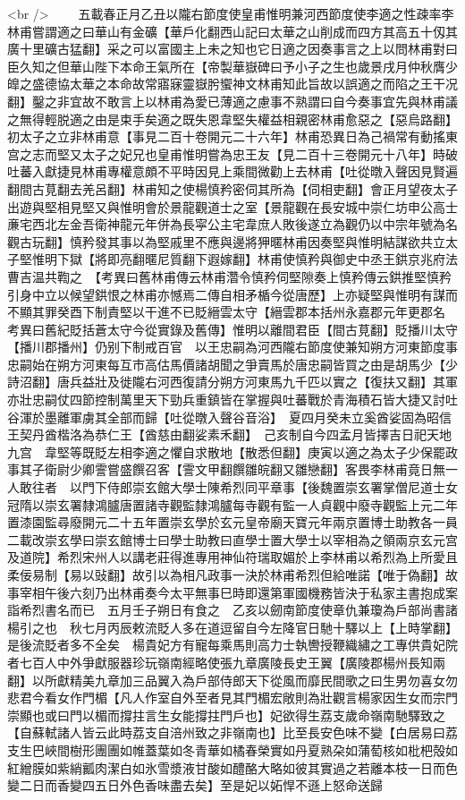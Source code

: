 <br />
　　五載春正月乙丑以隴右節度使皇甫惟明兼河西節度使李適之性疎率李林甫嘗謂適之曰華山有金礦【華戶化翻西山記曰太華之山削成而四方其高五十仭其廣十里礦古猛翻】采之可以富國主上未之知也它日適之因奏事言之上以問林甫對曰臣久知之但華山陛下本命王氣所在【帝製華嶽碑曰予小子之生也歲景戌月仲秋膺少皥之盛德協太華之本命故常寤寐靈嶽肹蠁神文林甫知此旨故以誤適之而陷之王干况翻】鑿之非宜故不敢言上以林甫為愛已薄適之慮事不熟謂曰自今奏事宜先與林甫議之無得輕脱適之由是束手矣適之既失恩韋堅失權益相親密林甫愈惡之【惡烏路翻】初太子之立非林甫意【事見二百十卷開元二十六年】林甫恐異日為己禍常有動搖東宫之志而堅又太子之妃兄也皇甫惟明嘗為忠王友【見二百十三卷開元十八年】時破吐蕃入獻捷見林甫專權意頗不平時因見上乘間微勸上去林甫【吐從暾入聲因見賢遍翻間古莧翻去羌呂翻】林甫知之使楊慎矜密伺其所為【伺相吏翻】會正月望夜太子出遊與堅相見堅又與惟明會於景龍觀道士之室【景龍觀在長安城中崇仁坊申公高士亷宅西北左金吾衛神龍元年併為長寜公主宅韋庶人敗後遂立為觀仍以中宗年號為名觀古玩翻】慎矜發其事以為堅戚里不應與邊將狎暱林甫因奏堅與惟明結謀欲共立太子堅惟明下獄【將即亮翻暱尼質翻下遐嫁翻】林甫使慎矜與御史中丞王鉷京兆府法曹吉温共鞫之　【考異曰舊林甫傳云林甫濳令慎矜伺堅隙奏上慎矜傳云鉷推堅慎矜引身中立以候望鉷恨之林甫亦憾焉二傳自相矛楯今從唐歷】上亦疑堅與惟明有謀而不顯其罪癸酉下制責堅以干進不已貶縉雲太守【縉雲郡本括州永嘉郡元年更郡名　考異曰舊紀貶括蒼太守今從實錄及舊傳】惟明以離間君臣【間古莧翻】貶播川太守【播川郡播州】仍别下制戒百官　以王忠嗣為河西隴右節度使兼知朔方河東節度事忠嗣始在朔方河東每互市高估馬價諸胡聞之爭賣馬於唐忠嗣皆買之由是胡馬少【少詩沼翻】唐兵益壯及徙隴右河西復請分朔方河東馬九千匹以實之【復扶又翻】其軍亦壯忠嗣仗四節控制萬里天下勁兵重鎮皆在掌握與吐蕃戰於青海積石皆大捷又討吐谷渾於墨離軍虜其全部而歸【吐從暾入聲谷音浴】　夏四月癸未立奚酋娑固為昭信王契丹酋楷洛為恭仁王【酋慈由翻娑素禾翻】　己亥制自今四孟月皆擇吉日祀天地九宫　韋堅等既貶左相李適之懼自求散地【散悉但翻】庚寅以適之為太子少保罷政事其子衛尉少卿霅嘗盛饌召客【霅文甲翻饌雛皖翻又雛戀翻】客畏李林甫竟日無一人敢往者　以門下侍郎崇玄館大學士陳希烈同平章事【後魏置崇玄署掌僧尼道士女冠隋以崇玄署隸鴻臚唐置諸寺觀監隸鴻臚每寺觀有監一人貞觀中廢寺觀監上元二年置漆園監尋廢開元二十五年置崇玄學於玄元皇帝廟天寶元年兩京置博士助教各一員二載改崇玄學曰崇玄館博士曰學士助教曰直學士置大學士以宰相為之領兩京玄元宫及道院】希烈宋州人以講老莊得進專用神仙符瑞取媚於上李林甫以希烈為上所愛且柔佞易制【易以䜴翻】故引以為相凡政事一決於林甫希烈但給唯諾【唯于偽翻】故事宰相午後六刻乃出林甫奏今太平無事巳時即還第軍國機務皆決于私家主書抱成案詣希烈書名而已　五月壬子朔日有食之　乙亥以劒南節度使章仇兼瓊為戶部尚書諸楊引之也　秋七月丙辰敕流貶人多在道逗留自今左降官日馳十驛以上【上時掌翻】是後流貶者多不全矣　楊貴妃方有寵每乘馬則高力士執轡授鞭織繡之工專供貴妃院者七百人中外爭獻服器珍玩嶺南經略使張九章廣陵長史王翼【廣陵郡楊州長知兩翻】以所獻精美九章加三品翼入為戶部侍郎天下從風而靡民間歌之曰生男勿喜女勿悲君今看女作門楣【凡人作室自外至者見其門楣宏敞則為壯觀言楊家因生女而宗門崇顯也或曰門以楣而撐拄言生女能撐拄門戶也】妃欲得生荔支歲命嶺南馳驛致之【自蘇軾諸人皆云此時荔支自涪州致之非嶺南也】比至長安色味不變【白居易曰荔支生巴峽間樹形團團如帷蓋葉如冬青華如橘春榮實如丹夏熟朶如蒲萄核如枇杷殻如紅繒膜如紫綃瓤肉潔白如氷雪漿液甘酸如醴酪大略如彼其實過之若離本枝一日而色變二日而香變四五日外色香味盡去矣】至是妃以妬悍不遜上怒命送歸